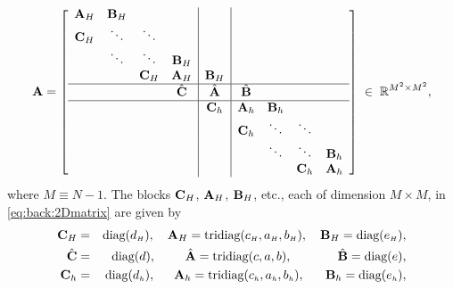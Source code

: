 \begin{equation}
\label{eq:back:2Dmatrix}
\mathbf{A}=\left[
  \begin{array}{cccc|c|cccc}
  \mathbf{A}_{H} & \mathbf{B}_{H}    &  &  &  &  &  &  &  \\
  \mathbf{C}_{H} &\ddots &\ddots  &  &  &  &  &  &  \\
         &  \ddots& \ddots & \mathbf{B}_{H}   &  &  &  &  &  \\
         &  & \mathbf{C}_H & \mathbf{A}_{H}  &  \mathbf{B}_{H}   &  &  &  &  \\ \hline
         &  &  & \hat{\mathbf{C}}  & \hat{\mathbf{A}}  & \hat{\mathbf{B}}  &  &  &  \\ \hline
         &  &  &  & \mathbf{C}_{h}  & \mathbf{A}_{h} & \mathbf{B}_{h}  &  &  \\
         &  &  &  &  & \mathbf{C}_{h}  & \ddots & \ddots &  \\
         &  &  &  &  &  & \ddots & \ddots & \mathbf{B}_{h}  \\
         &  &  &  &  &  &  & \mathbf{C}_{h}  & \mathbf{A}_{h}  \\
  \end{array}
\right]\;\in\;{\mathbb R}^{M^2\times M^2},
\end{equation}
where $M\equiv N-1$.
The blocks $\mathbf{C}_H$, $\mathbf{A}_H$, $\mathbf{B}_H$, etc., each of dimension $M\times M$, in
\eqref{eq:back:2Dmatrix} are given by
\begin{eqnarray}
\mathbf{C}_H&=&\text{diag}(d_{\scriptscriptstyle H}),\quad \mathbf{A}_H=\text{tridiag}(c_{\scriptscriptstyle H},a_{\scriptscriptstyle H},b_{\scriptscriptstyle H}),
\quad \mathbf{B}_H=\text{diag}(e_{\scriptscriptstyle H}),\nonumber\\
\hat{\mathbf{C}}&=&\text{diag}(d), \qquad \,\,\hat{\mathbf{A}}=\text{tridiag}(c,a,b),\qquad\quad\,\,\,\, \hat{\mathbf{B}}=\text{diag}(e),\\
\mathbf{C}_h&=&\text{diag}(d_{\scriptscriptstyle h}),\quad\,\,\, \mathbf{A}_h=\text{tridiag}(c_{\scriptscriptstyle h},a_{\scriptscriptstyle h},b_{\scriptscriptstyle h}), \quad \,\,\,\,\mathbf{B}_h=\text{diag}(e_{\scriptscriptstyle h}),\nonumber
\end{eqnarray}

